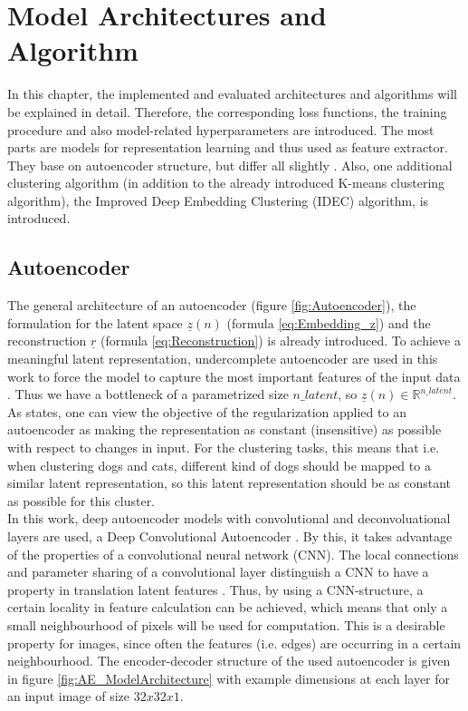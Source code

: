 \documentclass[12pt,DIV14,BCOR12mm,a4paper,footexclude,headinclude,halfparskip-,twoside,openright,cleardoubleempty,idxtotoc,bibtotoc,listtotoc,abstracton]{scrreprt} %
\numberwithin{equation}{chapter}
\begin{document}
\chapter{Model Architectures and Algorithm}
In this chapter, the implemented and evaluated architectures and algorithms will be explained in detail. Therefore, the corresponding loss functions, the training procedure and also model-related hyperparameters are introduced. The most parts are models for representation learning and thus used as feature extractor. They base on autoencoder structure, but differ all slightly . Also, one additional clustering algorithm (in addition to the already introduced K-means clustering algorithm), the Improved Deep Embedding Clustering (IDEC) algorithm, is introduced.
\section{Autoencoder}
\label{sec:AE}
The general architecture of an autoencoder (figure \ref{fig:Autoencoder}), the formulation for the latent space $\underline{z}(n)$ (formula \ref{eq:Embedding_z}) and the reconstruction $\underline{r}$ (formula \ref{eq:Reconstruction}) is already introduced. To achieve a meaningful latent representation, undercomplete autoencoder are used in this work to force the model to capture the most important features of the input data \cite{LectureNotes_DeepLearning}. Thus we have a bottleneck of a parametrized size $n\_latent$, so $\underline{z}(n) \in \mathbb{R}^{n\_latent}$. As \cite{Bengio-et-al-2013} states, one can view the objective of the regularization applied to an autoencoder as making the representation as constant (insensitive) as possible with respect to changes in input. For the clustering tasks, this means that i.e. when clustering dogs and cats, different kind of dogs should be mapped to a similar latent representation, so this latent representation should be as constant as possible for this cluster.\\
In this work, deep autoencoder models with convolutional and deconvoluational layers are used, a Deep Convolutional Autoencoder \cite{DeepCAE}. By this, it takes advantage of the properties of a convolutional neural network (CNN). The local connections and parameter sharing of a convolutional layer distinguish a CNN to have a property in translation latent features \cite{Goodfellow-et-al-2016}. Thus, by using a CNN-structure, a certain locality in feature calculation can be achieved, which means that only a small neighbourhood of pixels will be used for computation. This is a desirable property for images, since often the features (i.e. edges) are occurring in a certain neighbourhood. The encoder-decoder structure of the used autoencoder is given in figure \ref{fig:AE_ModelArchitecture} with example dimensions at each layer for an input image of size $32x32x1$.
\end{document}

